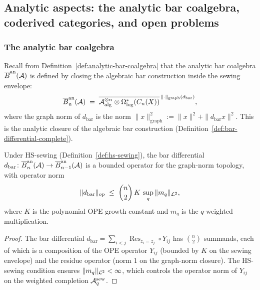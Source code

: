 %
%

\subsection{Analytic aspects: the analytic bar coalgebra,
coderived categories, and open problems}
\label{subsec:thqg-X-analytic-aspects}

\subsubsection{The analytic bar coalgebra}

\begin{definition}%
\label{def:thqg-X-analytic-bar-review}%
%
Recall from Definition~\ref{def:analytic-bar-coalgebra} that the
analytic bar coalgebra $\overline{B}^{\mathrm{an}}(\mathcal{A})$ is defined by closing
the algebraic bar construction inside the sewing envelope:
\[
\overline{B}^{\mathrm{an}}_n(\mathcal{A})
\;=\;
\overline{
\mathcal{A}_{\mathrm{alg}}^{\otimes n}
\otimes \Omega^*_{\log}(C_n(X))
}^{\,\|\cdot\|_{\mathrm{graph}}(d_{\mathrm{bar}})},
\]
where the graph norm of $d_{\mathrm{bar}}$ is the norm
$\|x\|_{\mathrm{graph}}^2 := \|x\|^2 + \|d_{\mathrm{bar}} x\|^2$.
This is the analytic closure of the algebraic bar construction
(Definition~\ref{def:bar-differential-complete}).
\end{definition}

\begin{proposition}%
\label{prop:thqg-X-analytic-bar-bounded}%
%
Under HS-sewing \textup{(}Definition~\textup{\ref{def:hs-sewing}}\textup{)},
the bar differential $d_{\mathrm{bar}} \colon \overline{B}^{\mathrm{an}}_n(\mathcal{A}) \to
\overline{B}^{\mathrm{an}}_{n-1}(\mathcal{A})$ is a bounded operator for the graph-norm
topology, with operator norm
\begin{equation}\label{eq:thqg-X-bar-bounded}
\|d_{\mathrm{bar}}\|_{\mathrm{op}}
\;\leq\;
\binom{n}{2}\,K\,\sup_q \|m_q\|_{\mathcal{L}^2},
\end{equation}
where $K$ is the polynomial OPE growth constant and $m_q$ is the
$q$-weighted multiplication.
\end{proposition}

\begin{proof}
The bar differential $d_{\mathrm{bar}} = \sum_{i<j}
\operatorname{Res}_{z_i=z_j} \circ Y_{ij}$ has
$\binom{n}{2}$ summands, each of which is a composition of
the OPE operator $Y_{ij}$ (bounded by $K$ on the sewing envelope)
and the residue operator (norm $1$ on the graph-norm closure).
The HS-sewing condition ensures $\|m_q\|_{\mathcal{L}^2} < \infty$,
which controls the operator norm of $Y_{ij}$ on the weighted
completion $\mathcal{A}^{\mathrm{sew}}_q$.
\end{proof}

